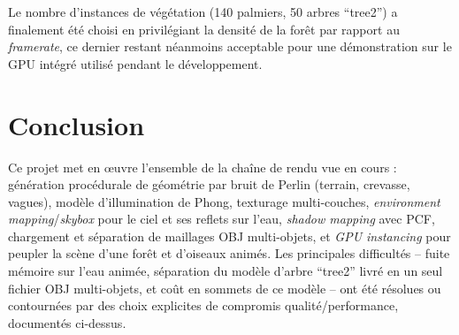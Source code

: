 \documentclass[11pt,a4paper]{article}
\begin{document}
Le nombre d'instances de végétation (140 palmiers, 50 arbres
``tree2'') a finalement été choisi en privilégiant la densité de la
forêt par rapport au \emph{framerate}, ce dernier restant néanmoins
acceptable pour une démonstration sur le GPU intégré utilisé pendant le
développement.

\section{Conclusion}

Ce projet met en \oe{}uvre l'ensemble de la chaîne de rendu vue en
cours : génération procédurale de géométrie par bruit de Perlin
(terrain, crevasse, vagues), modèle d'illumination de Phong, texturage
multi-couches, \emph{environment mapping}/\emph{skybox} pour le ciel et
ses reflets sur l'eau, \emph{shadow mapping} avec PCF, chargement et
séparation de maillages OBJ multi-objets, et \emph{GPU instancing} pour
peupler la scène d'une forêt et d'oiseaux animés. Les principales
difficultés -- fuite mémoire sur l'eau animée, séparation du modèle
d'arbre ``tree2'' livré en un seul fichier OBJ multi-objets, et coût en
sommets de ce modèle -- ont été résolues ou contournées par des choix
explicites de compromis qualité/performance, documentés ci-dessus.
\end{document}

